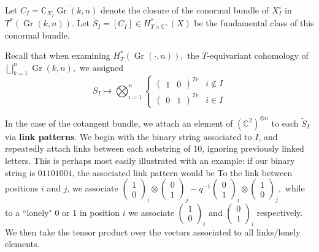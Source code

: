 \documentclass[12pt]{amsart}
\numberwithin{equation}{section}
\theoremstyle{definition}
\numberwithin{figure}{section}
\newcommand{\C}{\mathbb{C}}
\newcommand{\on}[1]{\operatorname{#1}}
\newcommand{\Gr}{\on{Gr}}
\newcommand{\Stil}{\tilde{S}}
\begin{document}
Let $C_I = \overline{\C_{X_I^\circ} \Gr(k, n)}$ denote the closure of the conormal bundle of $X_I^\circ$ in $T^*(\Gr(k,n)).$ Let $\Stil_I = [C_I] \in H_{T \times \C^\times}^*(X)$ be the fundamental class of this conormal bundle.

Recall that when examining $H_T^*(\Gr(\cdot, n)),$ the $T$-equivariant cohomology of $\bigsqcup_{k=1}^n \Gr(k,n),$ we assigned 
\[S_I \mapsto \bigotimes_{i=1}^n \begin{cases}
	\begin{pmatrix}
		1 & 0
	\end{pmatrix}^{Tr} & i \not \in I\\
	\begin{pmatrix}
		0 & 1
	\end{pmatrix}^{Tr} & i \in I
\end{cases}\]

In the case of the cotangent bundle, we attach an element of $(\C^2)^{\otimes n}$ to each $\Stil_I$ via \textbf{link patterns}. We begin with the binary string associated to $I$, and repeatedly attach links between each substring of $1 0$, ignoring previously linked letters. This is perhaps most easily illustrated with an example: if our binary string is $01101001$, the associated link pattern would be 
To the link  between positions $i$ and $j$, we associate
$\begin{pmatrix}
	1\\
	0
\end{pmatrix}_i
\otimes
\begin{pmatrix}
	0\\
	1
\end{pmatrix}_j
-
q^{-1}
\begin{pmatrix}
	0\\
	1
\end{pmatrix}_i
\otimes
\begin{pmatrix}
	1\\
	0
\end{pmatrix}_j,
$
while to a ``lonely" $0$ or $1$ in position $i$ we associate $\begin{pmatrix} 1\\ 0\end{pmatrix}_i$ and $\begin{pmatrix} 0\\ 1\end{pmatrix}_i$ respectively. We then take the tensor product over the vectors associated to all links/lonely elements. 
\end{document}

